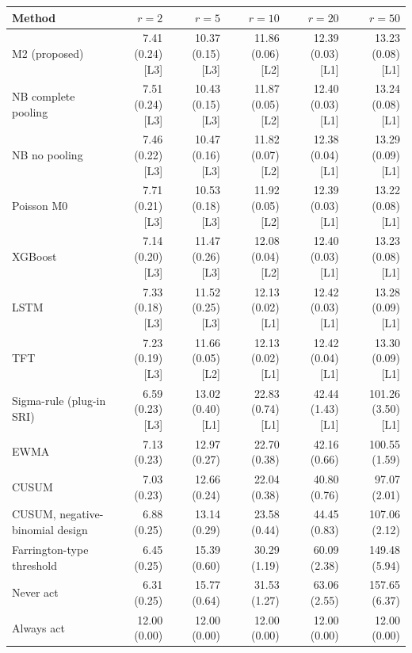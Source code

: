 \noindent\begin{minipage}{\linewidth}
\label{tab:S19.3}
\centering\scriptsize
\begin{tabular}{lrrrrr}
\toprule
Method & $r = 2$ & $r = 5$ & $r = 10$ & $r = 20$ & $r = 50$ \\ \midrule
M2 (proposed) & 7.41 (0.24) [L3] & 10.37 (0.15) [L3] & 11.86 (0.06) [L2] & 12.39 (0.03) [L1] & 13.23 (0.08) [L1] \\
NB complete pooling & 7.51 (0.24) [L3] & 10.43 (0.15) [L3] & 11.87 (0.05) [L2] & 12.40 (0.03) [L1] & 13.24 (0.08) [L1] \\
NB no pooling & 7.46 (0.22) [L3] & 10.47 (0.16) [L3] & 11.82 (0.07) [L2] & 12.38 (0.04) [L1] & 13.29 (0.09) [L1] \\
Poisson M0 & 7.71 (0.21) [L3] & 10.53 (0.18) [L3] & 11.92 (0.05) [L2] & 12.39 (0.03) [L1] & 13.22 (0.08) [L1] \\
XGBoost & 7.14 (0.20) [L3] & 11.47 (0.26) [L3] & 12.08 (0.04) [L2] & 12.40 (0.03) [L1] & 13.23 (0.08) [L1] \\
LSTM & 7.33 (0.18) [L3] & 11.52 (0.25) [L3] & 12.13 (0.02) [L1] & 12.42 (0.03) [L1] & 13.28 (0.09) [L1] \\
TFT & 7.23 (0.19) [L3] & 11.66 (0.05) [L2] & 12.13 (0.02) [L1] & 12.42 (0.04) [L1] & 13.30 (0.09) [L1] \\
Sigma-rule (plug-in SRI) & 6.59 (0.23) [L3] & 13.02 (0.40) [L1] & 22.83 (0.74) [L1] & 42.44 (1.43) [L1] & 101.26 (3.50) [L1] \\
EWMA & 7.13 (0.23) & 12.97 (0.27) & 22.70 (0.38) & 42.16 (0.66) & 100.55 (1.59) \\
CUSUM & 7.03 (0.23) & 12.66 (0.24) & 22.04 (0.38) & 40.80 (0.76) & 97.07 (2.01) \\
CUSUM, negative-binomial design & 6.88 (0.25) & 13.14 (0.29) & 23.58 (0.44) & 44.45 (0.83) & 107.06 (2.12) \\
Farrington-type threshold & 6.45 (0.25) & 15.39 (0.60) & 30.29 (1.19) & 60.09 (2.38) & 149.48 (5.94) \\
Never act & 6.31 (0.25) & 15.77 (0.64) & 31.53 (1.27) & 63.06 (2.55) & 157.65 (6.37) \\
Always act & 12.00 (0.00) & 12.00 (0.00) & 12.00 (0.00) & 12.00 (0.00) & 12.00 (0.00) \\
\bottomrule
\end{tabular}
\end{minipage}
\vspace{14pt}

